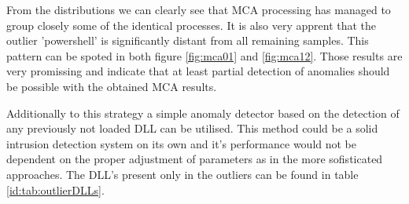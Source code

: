 \documentclass[a4paper,twoside,12pt]{book}
\begin{document}
From the distributions we can clearly see that MCA processing has managed to group closely some of the
identical processes. It is also very apprent that the outlier 'powershell' is significantly distant from all remaining samples. 
This pattern can be spoted in both figure \ref{fig:mca01} and \ref{fig:mca12}. Those results are very 
promissing and indicate that at least partial detection of anomalies should be possible with the obtained MCA results.

Additionally to this strategy a simple anomaly detector based on the detection of any previously not loaded
DLL can be utilised. This method could be a solid intrusion detection system on its own and it's performance
would not be dependent on the proper adjustment of parameters as in the more sofisticated approaches. The 
DLL's present only in the outliers can be found in table \ref{id:tab:outlierDLLs}.
\end{document}

